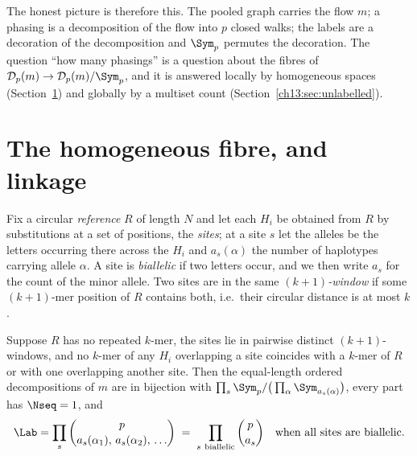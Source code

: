 The honest picture is therefore this. The pooled graph carries the flow $m$; a phasing is a
decomposition of the flow into $p$ closed walks; the labels are a decoration of the
decomposition and $\Sym_p$ permutes the decoration. The question ``how many phasings'' is a
question about the fibres of $\mathcal D_p(m)\to\mathcal D_p(m)/\Sym_p$, and it is answered
locally by homogeneous spaces (Section~\ref{ch13:sec:sites}) and globally by a multiset count
(Section~\ref{ch13:sec:unlabelled}).

\section{The homogeneous fibre, and linkage}\label{ch13:sec:sites}

Fix a circular \emph{reference} $R$ of length $N$ and let each $H_i$ be obtained from $R$ by
substitutions at a set of positions, the \emph{sites}; at a site $s$ let the alleles be the
letters occurring there across the $H_i$ and $a_s(\alpha)$ the number of haplotypes carrying
allele $\alpha$. A site is \emph{biallelic} if two letters occur, and we then write $a_s$ for
the count of the minor allele. Two sites are in the same \emph{$(k{+}1)$-window} if some
$(k{+}1)$-mer position of $R$ contains both, i.e.\ their circular distance is at most $k$.

\begin{theorem}\label{ch13:thm:sites}
Suppose $R$ has no repeated $k$-mer, the sites lie in pairwise distinct $(k{+}1)$-windows, and
no $k$-mer of any $H_i$ overlapping a site coincides with a $k$-mer of $R$ or with one
overlapping another site. Then the equal-length ordered decompositions of $m$ are in bijection
with $\prod_s\Sym_p/\big(\prod_\alpha\Sym_{a_s(\alpha)}\big)$, every part has $\Nseq=1$, and
\[
  \Lab=\prod_s\binom{p}{a_s(\alpha_1),\,a_s(\alpha_2),\,\dots}
  \;=\;\prod_{s\ \text{biallelic}}\binom{p}{a_s}\quad\text{when all sites are biallelic.}
\]
\end{theorem}

